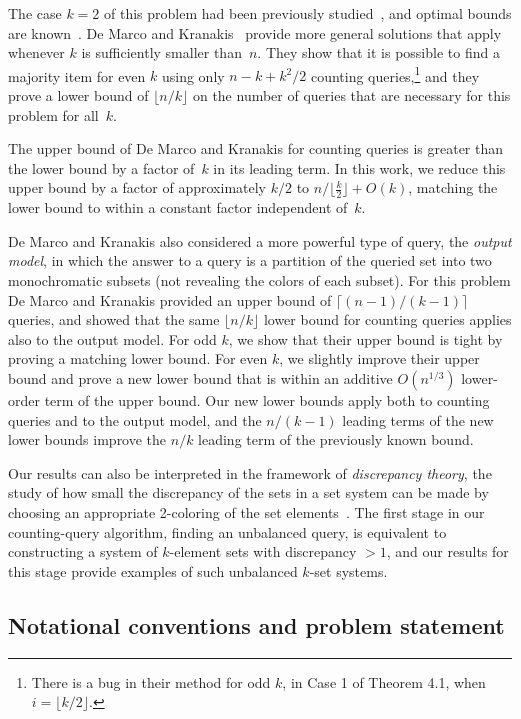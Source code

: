 \documentclass[11pt]{llncs}
\begin{document}
The case $k=2$ of this problem had been previously studied~\cite{AloReiSch-IPL-93,AloReiSch-SJC-97,SakWer-Comb-91}, and optimal bounds are known~\cite{AloReiSch-IPL-93,SakWer-Comb-91}.
De Marco and Kranakis~\cite{DeMKra-DMAA-15} provide more general solutions that apply whenever $k$ is sufficiently smaller than~$n$. They show that it is possible to find a majority item for even $k$ using only $n-k+k^2/2$ counting queries,\footnote{There is a bug in their method for odd $k$, in Case 1 of Theorem 4.1, when $i=\lfloor k/2\rfloor$.} and they prove a lower bound of $\lfloor n/k\rfloor$ on the number of queries that are necessary for this problem for all~$k$.

The upper bound of De Marco and Kranakis for counting queries is greater than the lower bound by a factor of~$k$ in its leading term. In this work, we reduce this upper bound by a factor of approximately $k/2$ to $n/\lfloor\tfrac{k}{2}\rfloor+O(k)$, matching the lower bound to within a constant factor independent of~$k$. 

De Marco and Kranakis also considered a more powerful type of query, the \emph{output model}, in which the answer to a query is a partition of the queried set into two monochromatic subsets (not revealing the colors of each subset). For this problem De Marco and Kranakis provided an upper bound of $\lceil (n-1)/(k-1)\rceil$ queries, and showed that the same $\lfloor n/k\rfloor$ lower bound for counting queries applies also to the output model. For odd $k$, we show that their upper bound is tight by proving a matching lower bound. For even $k$, we slightly improve their upper bound and prove a new lower bound that is within an additive $O(n^{1/3})$ lower-order term of the upper bound. Our new lower bounds apply both to counting queries and to the output model, and the $n/(k-1)$ leading terms of the new lower bounds improve the $n/k$ leading term of the previously known bound.

Our results can also be interpreted in the framework of \emph{discrepancy theory}, the study of how small the discrepancy of the sets in a set system can be made by choosing an appropriate 2-coloring of the set elements~\cite{BecChe-08}. The first stage in our counting-query algorithm, finding an unbalanced query, is equivalent to constructing a system of $k$-element sets with discrepancy $>1$, and our results for this stage provide examples of such unbalanced $k$-set systems.

\subsection{Notational conventions and problem statement}
\end{document}
